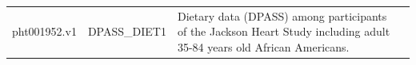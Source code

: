 \documentclass[11pt]{article}
\begin{document}
\begin{tabular}{r|lll}
	 pht001952.v1                                                                                                                                                                                                                                                                                                                                                                                                                                                                                                                                                                                                                                                                                                                                                                                                                                                                                                                                                                                  & DPASS\_DIET1                                                                                                                                                                                                                                                                                                                                                                                                                                                                                                                                                                                                                                                                                                                                                                                                                                                                                                                                                                                 & Dietary data (DPASS) among participants of the Jackson Heart Study including adult 35-84 years old African Americans.                                                                                                                                                                                                                                                                                                                                                                                                                                                                                                                                                                                                                                                                                                                                                                                                                                                                        \\
\end{tabular}
\end{document}
